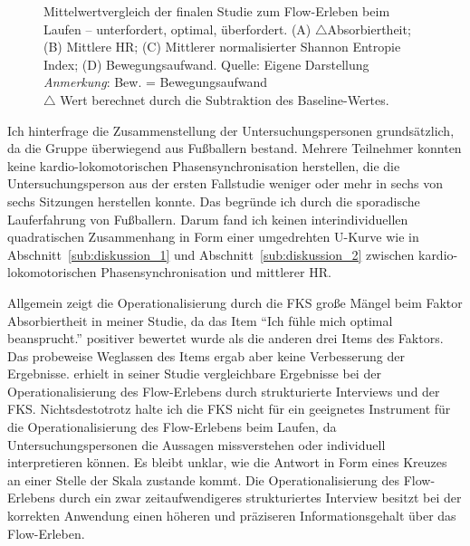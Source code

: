 \begin{figure}
	
	\caption[Mittelwertvergleich (Studie: Laufen)]{Mittelwertvergleich der finalen Studie zum Flow-Erleben beim Laufen -- unterfordert, optimal, überfordert. (A) $\bigtriangleup$Absorbiertheit; (B) Mittlere HR; (C) Mittlerer normalisierter Shannon Entropie Index; (D) Bewegungsaufwand. Quelle: Eigene Darstellung \\ \hspace{\textwidth}\emph{Anmerkung}: Bew. = Bewegungsaufwand\\ \hspace{\textwidth}$\bigtriangleup$ Wert berechnet durch die Subtraktion des Baseline-Wertes.}
	\label{fig:5_20_mittelwert_vergleich}
\end{figure}

Ich hinterfrage die Zusammenstellung der Untersuchungspersonen grundsätzlich, da die Gruppe überwiegend aus Fußballern bestand. Mehrere Teilnehmer konnten keine kardio-lokomotorischen Phasensynchronisation herstellen, die die Untersuchungsperson aus der ersten Fallstudie weniger oder mehr in sechs von sechs Sitzungen herstellen konnte. Das begründe ich durch die sporadische Lauferfahrung von Fußballern. Darum fand ich keinen interindividuellen quadratischen Zusammenhang in Form einer umgedrehten U-Kurve wie in Abschnitt~\ref{sub:diskussion_1} und Abschnitt~\ref{sub:diskussion_2} zwischen kardio-lokomotorischen Phasensynchronisation und mittlerer \ac{HR}.

Allgemein zeigt die Operationalisierung durch die \ac{FKS} große Mängel beim Faktor Absorbiertheit in meiner Studie, da das Item "`Ich fühle mich optimal beansprucht."' positiver bewertet wurde als die anderen drei Items des Faktors. Das probeweise Weglassen des Items ergab aber keine Verbesserung der Ergebnisse. \citet{Henk2014} erhielt in seiner Studie vergleichbare Ergebnisse bei der Operationalisierung des Flow-Erlebens durch strukturierte Interviews und der \ac{FKS}. Nichtsdestotrotz halte ich die \ac{FKS} nicht für ein geeignetes Instrument für die Operationalisierung des Flow-Erlebens beim Laufen, da Untersuchungspersonen die Aussagen missverstehen oder individuell interpretieren können. Es bleibt unklar, wie die Antwort in Form eines Kreuzes an einer Stelle der Skala zustande kommt. Die Operationalisierung des Flow-Erlebens durch ein zwar zeitaufwendigeres strukturiertes Interview besitzt bei der korrekten Anwendung einen höheren und präziseren Informationsgehalt über das Flow-Erleben. 

